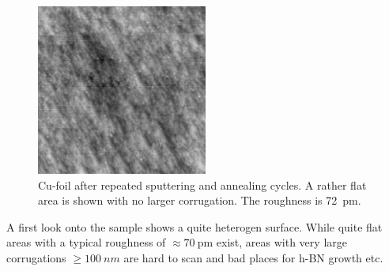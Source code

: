 \begin{figure}[h!]
 \centering
 \includegraphics[width=0.5\textwidth]{./images/F150331-125720.jpg}
 \caption{Cu-foil after repeated sputtering and annealing cycles. A rather flat area is shown with no larger corrugation. The roughness is \SI{72}{\pico\meter}.}
 \label{fig:cu-foil-clean}
\end{figure}

A first look onto the sample shows a quite heterogen surface. While quite flat areas with a typical roughness of $\approx \SI{70}{\pico\meter}$ exist, areas with very large corrugations $\geq \SI{100}{nm}$ are hard to scan and bad places for h-BN growth etc.